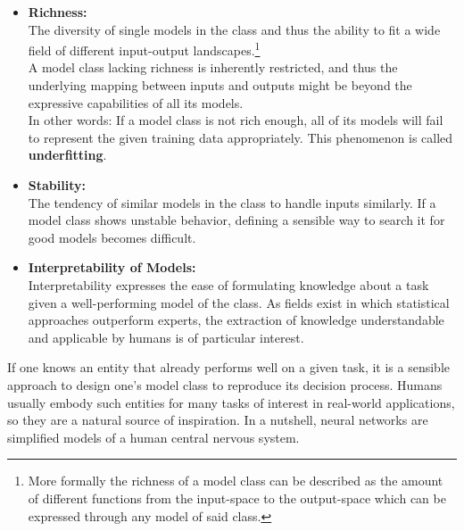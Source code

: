 \begin{itemize}
	\item \textbf{Richness:}\\
	The diversity of single models in the class and thus the ability to fit a wide field of different input-output landscapes.\footnote{More formally the richness of a model class can be described as the amount of different functions from the input-space to the output-space which can be expressed through any model of said class.}\\
	A model class lacking richness is inherently restricted, and thus the underlying mapping between inputs and outputs might be beyond the expressive capabilities of all its models.\\
	In other words: If a model class is not rich enough, all of its models will fail to represent the given training data appropriately. This phenomenon is called \textbf{underfitting}.\\
	\item \textbf{Stability:}\\ 
	The tendency of similar models in the class to handle inputs similarly.
	If a model class shows unstable behavior, defining a sensible way to search it for good models becomes difficult.\\
	\item \textbf{Interpretability of Models:}\\
	Interpretability expresses the ease of formulating knowledge about a task given a well-performing model of the class.
	As fields exist in which statistical approaches outperform experts, the extraction of knowledge understandable and applicable by humans is of particular interest.\\
\end{itemize}
If one knows an entity that already performs well on a given task, it is a sensible approach to design one's model class to reproduce its decision process. Humans usually embody such entities for many tasks of interest in real-world applications, so they are a natural source of inspiration. In a nutshell, neural networks are simplified models of a human central nervous system.\\

